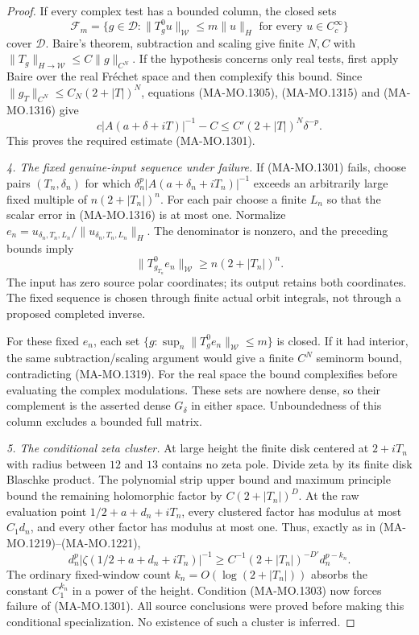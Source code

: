 \begin{proof}
If every complex test has a bounded column, the closed sets
\[
 \mathcal F_m=\{g\in\mathcal D:
       \|T_g^0u\|_{\mathcal W}\le m\|u\|_H
                            \text{ for every }u\in C_c^\infty\}
 \tag{MA-MO.1317}
\]
cover $\mathcal D$.  Baire's theorem, subtraction and scaling
give finite $N,C$ with
$\|T_g\|_{H\to\mathcal W}\le C\|g\|_{C^N}$.
If the hypothesis concerns only real tests, first apply Baire
over the real Fr\'echet space and then complexify this bound.
Since $\|g_T\|_{C^N}\le C_N(2+|T|)^N$, equations
(MA-MO.1305), (MA-MO.1315) and (MA-MO.1316) give
\[
 c|A(a+\delta+iT)|^{-1}-C
          \le C'(2+|T|)^N\delta^{-p}.
 \tag{MA-MO.1318}
\]
This proves the required estimate (MA-MO.1301).

\emph{4. The fixed genuine-input sequence under failure.}
If (MA-MO.1301) fails, choose pairs $(T_n,\delta_n)$ for which
$\delta_n^p|A(a+\delta_n+iT_n)|^{-1}$ exceeds an arbitrarily
large fixed multiple of $n(2+|T_n|)^n$.
For each pair choose a finite $L_n$ so that the scalar error
in (MA-MO.1316) is at most one.  Normalize
$e_n=u_{\delta_n,T_n,L_n}/\|u_{\delta_n,T_n,L_n}\|_H$.
The denominator is nonzero, and the preceding bounds imply
\[
           \|T_{g_{T_n}}^0e_n\|_{\mathcal W}
                               \ge n(2+|T_n|)^n.
 \tag{MA-MO.1319}
\]
The input has zero source polar coordinates; its output retains
both coordinates.  The fixed sequence is chosen through finite
actual orbit integrals, not through a proposed completed inverse.

For these fixed $e_n$, each set
$\{g:\sup_n\|T_g^0e_n\|_{\mathcal W}\le m\}$ is closed.
If it had interior, the same subtraction/scaling argument would
give a finite $C^N$ seminorm bound, contradicting (MA-MO.1319).
For the real space the bound complexifies before evaluating the
complex modulations.  These sets are nowhere dense, so their
complement is the asserted dense $G_\delta$ in either space.
Unboundedness of this column excludes a bounded full matrix.

\emph{5. The conditional zeta cluster.}
At large height the finite disk centered at $2+iT_n$ with radius
between $12$ and $13$ contains no zeta pole.  Divide zeta by its
finite disk Blaschke product.  The polynomial strip upper bound
and maximum principle bound the remaining holomorphic factor
by $C(2+|T_n|)^D$.  At the raw evaluation point
$1/2+a+d_n+iT_n$, every clustered factor has modulus at most
$C_1d_n$, and every other factor has modulus at most one.
Thus, exactly as in (MA-MO.1219)--(MA-MO.1221),
\[
 d_n^p|\zeta(1/2+a+d_n+iT_n)|^{-1}
       \ge C^{-1}(2+|T_n|)^{-D'}d_n^{p-k_n}.
 \tag{MA-MO.1320}
\]
The ordinary fixed-window count $k_n=O(\log(2+|T_n|))$
absorbs the constant $C_1^{k_n}$ in a power of the height.
Condition (MA-MO.1303) now forces failure of (MA-MO.1301).
All source conclusions were proved before making this conditional
specialization.  No existence of such a cluster is inferred.
\end{proof}

